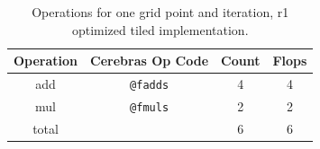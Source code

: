 \begin{table}[h]
    \centering
    \caption{Operations for one grid point and iteration, r1 optimized tiled implementation.}
    \label{tab:tiled_operations_r1_optimized}
    \begin{tabular}{@{}cccc@{}}
        \toprule
        Operation & Cerebras Op Code & Count & Flops \\
        \midrule
        add & \texttt{@fadds} & \num{4} & \num{4} \\
        mul & \texttt{@fmuls} & \num{2} & \num{2} \\
        \midrule
        total & & \num{6} & \num{6} \\
        \bottomrule
    \end{tabular}
\end{table}

